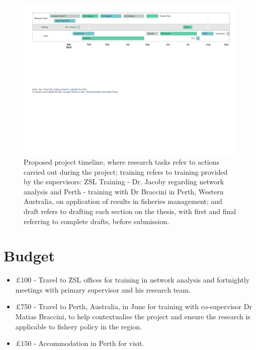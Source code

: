 \documentclass[11pt,a4paper,titlepage]{article}
\begin{document}
	
	\begin{figure}[h]
		\centering
		\includegraphics[width=\linewidth,trim={0 14cm 0 0},clip]{gantt.pdf}
		\caption{Proposed project timeline, where research tasks refer to actions carried out during the project; training refers to training provided by the supervisors: ZSL Training - Dr. Jacoby regarding network analysis and Perth - training with Dr Braccini in Perth, Western Australia, on application of results in fisheries management; and draft refers to drafting each section on the thesis, with first and final referring to complete drafts, before submission.}
		\label{fig:gantt}
	\end{figure}
	
	\section{Budget}
	
	\begin{itemize}
		\item $\pounds$100 - Travel to ZSL offices for training in network analysis and fortnightly meetings with primary supervisor and his research team.
		\item $\pounds$750 - Travel to Perth, Australia, in June for training with co-supervisor Dr Matias Braccini, to help contextualise the project and ensure the research is applicable to fishery policy in the region.
		\item $\pounds$150 - Accommodation in Perth for visit.
	\end{itemize}

	\newpage
	
	
	
\end{document}
